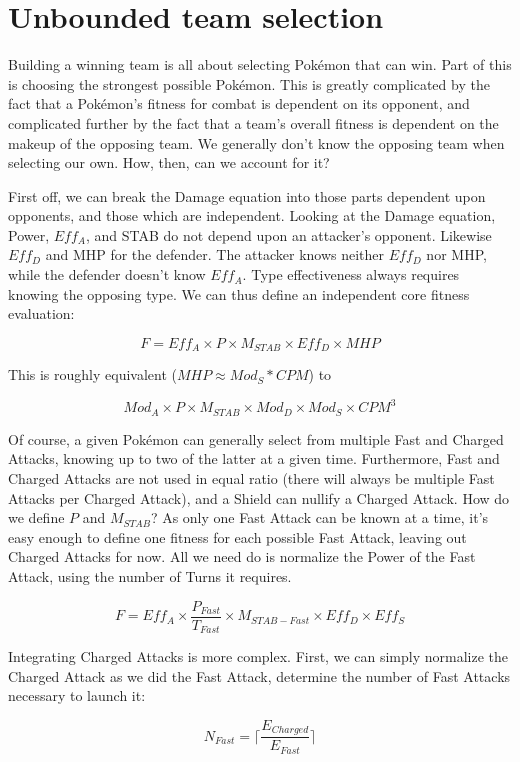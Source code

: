 \chapter{Unbounded team selection}
\label{chap:unbounded}

Building a winning team is all about selecting Pokémon that can win.
Part of this is choosing the strongest possible Pokémon.
This is greatly complicated by the fact that a Pokémon's fitness for
 combat is dependent on its opponent, and complicated further by
 the fact that a team's overall fitness is dependent on the makeup
 of the opposing team.
We generally don't know the opposing team when selecting our own.
How, then, can we account for it?

First off, we can break the Damage equation into those parts dependent
 upon opponents, and those which are independent.
Looking at the Damage equation, Power, $Eff_A$, and STAB do not depend
 upon an attacker's opponent.
Likewise $Eff_D$ and MHP for the defender.
The attacker knows neither $Eff_D$ nor MHP, while the defender doesn't know $Eff_A$.
Type effectiveness always requires knowing the opposing type.
We can thus define an independent core fitness evaluation:

\[ F = Eff_A \times P \times M_{STAB} \times Eff_D \times MHP \]

This is roughly equivalent ($MHP \approx Mod_S * CPM$) to

\[ Mod_A \times P \times M_{STAB} \times Mod_D \times Mod_S \times CPM^3 \]

Of course, a given Pokémon can generally select from multiple Fast and Charged Attacks,
  knowing up to two of the latter at a given time.
Furthermore, Fast and Charged Attacks are not used in equal ratio (there will
  always be multiple Fast Attacks per Charged Attack), and a Shield can
  nullify a Charged Attack.
How do we define $P$ and $M_{STAB}$?
As only one Fast Attack can be known at a time, it's easy enough to define one
  fitness for each possible Fast Attack, leaving out Charged Attacks for now.
All we need do is normalize the Power of the Fast Attack, using the number of
  Turns it requires.

\[ F = Eff_A \times \frac{P_{Fast}}{T_{Fast}} \times M_{STAB-Fast} \times Eff_D \times Eff_S \]

Integrating Charged Attacks is more complex.
First, we can simply normalize the Charged Attack as we did the Fast Attack,
 determine the number of Fast Attacks necessary to launch it:

\[ N_{Fast} = \lceil\frac{E_{Charged}}{E_{Fast}}\rceil \]

